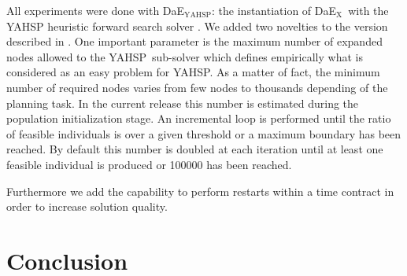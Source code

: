 \documentclass[letterpaper]{article}
\newcommand{\DAEX}{{\sc DaE$_{\text{X}}$}}
\newcommand{\DAEYAHSP}{{\sc DaE$_{\text{YAHSP}}$}}
\newcommand{\YAHSP}{{\sc YAHSP}}
\begin{document}
All experiments were done with \DAEYAHSP: the instantiation of \DAEX\ with the
YAHSP heuristic forward search  solver \cite{yahsp:icaps2004}. %
We added two novelties to the version described in
\cite{dae:icaps2010}.  One important parameter is the maximum number of expanded
nodes allowed to the \YAHSP\ sub-solver which defines empirically what is
considered as an easy problem for \YAHSP. As a matter of fact, the minimum
number of required nodes varies from few nodes to thousands depending of the
planning task.  In the current release this number is estimated during the
population initialization stage. An incremental loop is performed until the
ratio of feasible individuals is over a given threshold or a maximum boundary has
been reached. By default this number is doubled at each iteration until at least
one feasible individual is produced or 100000 has been reached.

Furthermore we add the capability to perform restarts within a time contract in
order to increase solution quality.

\section{Conclusion}



\end{document}
